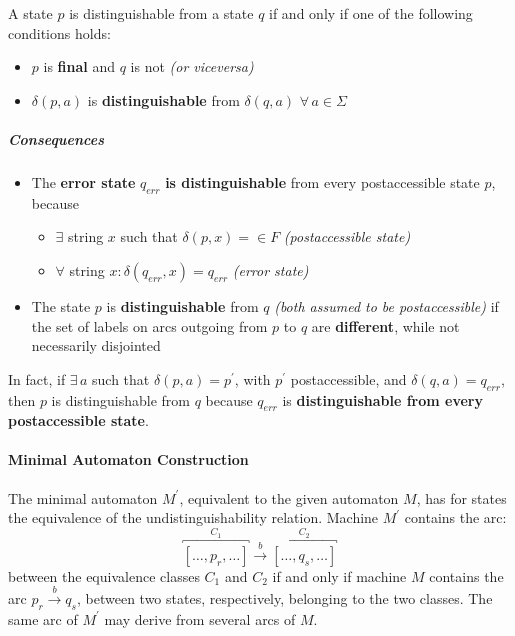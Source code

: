 \documentclass[english]{article}
\begin{document}
\begin{definition}
  \label{def:distinguishability-inductive}
  A state \(p\) is distinguishable from a state \(q\) if and only if one of the following conditions holds:

  \begin{itemize}
    \item \(p\) is \textbf{final} and \(q\) is not \textit{(or viceversa)}
    \item \(\delta(p, a)\) is \textbf{distinguishable} from \(\delta(q, a)\) \(\forall \, a \in \Sigma\)
  \end{itemize}
\end{definition}

\subparagraph*{Consequences}

\begin{itemize}[label=\(\Rightarrow\)]
  \item The \textbf{error state} \(q_\textit{err}\) \textbf{is distinguishable} from every postaccessible state \(p\), because
        \begin{itemize}
          \item \(\exists\) string \(x\) such that \(\delta(p, x) = \in F\) \textit{(postaccessible state)}
          \item \(\forall\) string \(x: \delta(q_\textit{err}, x) = q_\textit{err}\) \textit{(error state)}
        \end{itemize}
  \item The state \(p\) is \textbf{distinguishable} from \(q\) \textit{(both assumed to be postaccessible)} if the set of labels on arcs outgoing from \(p\) to \(q\) are \textbf{different}, while not necessarily disjointed
\end{itemize}

In fact, if \(\exists \, a\) such that \(\delta(p, a) = p^\prime\), with \(p^\prime\) postaccessible, and \(\delta(q, a) = q_\textit{err}\), then \(p\) is distinguishable from \(q\) because \(q_\textit{err}\) is \textbf{distinguishable from every postaccessible state}.

\paragraph{Minimal Automaton Construction}

The minimal automaton \(M^\prime\), equivalent to the given automaton \(M\), has for states the equivalence of the undistinguishability relation.
Machine \(M^\prime\) contains the arc:
\[ \overbracket{\left[ \ldots, p_r, \ldots  \right]}^{C_1} \xrightarrow{b} \overbracket{\left[ \ldots, q_s, \ldots  \right]}^{C_2} \]
between the equivalence classes \(C_1\) and \(C_2\) if and only if machine \(M\) contains the arc \(p_r \xrightarrow{b} q_s\), between two states, respectively, belonging to the two classes.
The same arc of \(M^\prime\) may derive from several arcs of \(M\).
\end{document}
